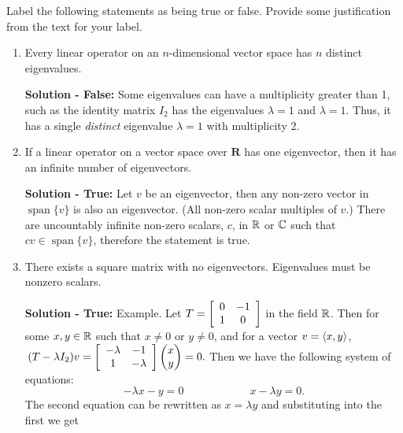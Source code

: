 Label the following statements as being true or false.
Provide some justification from the text for your label.
\begin{enumerate}
    \item Every linear operator on an $n$-dimensional vector space has $n$ distinct eigenvalues.
    \begin{mybox}
        \textbf{Solution - False: } Some eigenvalues can have a multiplicity greater than 1, such as the identity matrix $I_2$ has the eigenvalues $\lambda = 1$ and $\lambda = 1$. Thus, it has a single \textit{distinct} eigenvalue $\lambda = 1$ with multiplicity 2.
    \end{mybox}



    \item If a linear operator on a vector space over $\mathbf{R}$ has one eigenvector, then it has an infinite number of eigenvectors.
    \begin{mybox}
        \textbf{Solution - True: } Let $v$ be an eigenvector, then any non-zero vector in $\operatorname{span}\{v\}$ is also an eigenvector. (All non-zero scalar multiples of $v$.) There are uncountably infinite non-zero scalars, $c$, in $\mathbb{R}$ or $\mathbb{C}$ such that $cv \in \operatorname{span}\{v\}$, therefore the statement is true. 
    \end{mybox}
\newpage
    \item There exists a square matrix with no eigenvectors.
    Eigenvalues must be nonzero scalars.
    \begin{mybox}
        \textbf{Solution - True: } Example. Let $T = \left[ {
            \begin{array}{cc}
              0 & -1  \\
              1 & 0 \\
            \end{array}} \right]$ in the field $\mathbb{R}$. Then for some $x,y \in \mathbb{R}$ such that $x \neq 0 \text{ or } y \neq 0$, and for a vector  $v = \left\langle{x,y}\right\rangle$, $\,(T-\lambda I_2)v = \left[ { \begin{array}{cc}
            -\lambda & -1  \\
            1 & -\lambda \\
          \end{array}} \right] \begin{pmatrix}{x}\\{y}\end{pmatrix} = 0.$ Then we have the following system of equations:
          $$-\lambda x - y = 0 \hspace{1in} x - \lambda y = 0.$$
          The second equation can be rewritten as $x = \lambda y$ and substituting into the first we get

\end{mybox}
\end{enumerate}
